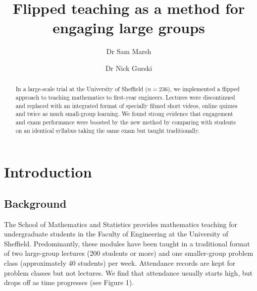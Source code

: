 \documentclass{amsart}
\title{Flipped teaching as a method for engaging large groups}
\author{Dr Sam Marsh}
\author{Dr Nick Gurski}
\begin{document}
\maketitle

\begin{abstract}
In a large-scale trial at the University of Sheffield ($n=236$), we implemented a flipped approach to teaching mathematics to first-year engineers. Lectures were discontinued and replaced with an integrated format of specially filmed short videos, online quizzes and twice as much small-group learning.  We found strong evidence that engagement and exam performance were boosted by the new method by comparing with students on an identical syllabus taking the same exam but taught traditionally.
\end{abstract}

\section{Introduction}

\subsection{Background}

The School of Mathematics and Statistics provides mathematics teaching for undergraduate students in the Faculty of Engineering at the University of Sheffield. Predominantly, these modules have been taught in a traditional format of two large-group lectures (200 students or more) and one smaller-group problem class (approximately 40 students) per week.  Attendance records are kept for problem classes but not lectures.  We find that attendance usually starts high, but drops off as time progresses (see Figure 1).
\end{document}
